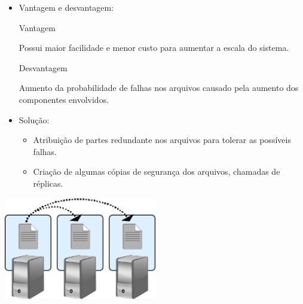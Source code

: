 \begin{frame}{}
	\begin{itemize}
	\item Vantagem e desvantagem:
	\\
	\begin{block}{Vantagem}
		
	Possui maior facilidade e menor custo para aumentar a escala do sistema.
	\end{block}
	\begin{block}{Desvantagem}
	
	Aumento da probabilidade de falhas nos arquivos causado pela aumento dos componentes envolvidos.
	
	\end{block}
	
	\end{itemize}
\end{frame}


\begin{frame}{}
	
	\begin{itemize}
	\item Solução:
	\\
	
		\begin{itemize}
		\item Atribuição de partes redundante nos arquivos para tolerar as possíveis falhas.
		
		
		\item Criação de algumas cópias de segurança dos arquivos, chamadas de réplicas.
		
		\end{itemize}
	\end{itemize}
	
	\begin{center}
		\includegraphics[width=0.5\textwidth]{imagens/replica}
		
	\end{center}
	
\end{frame}
	
